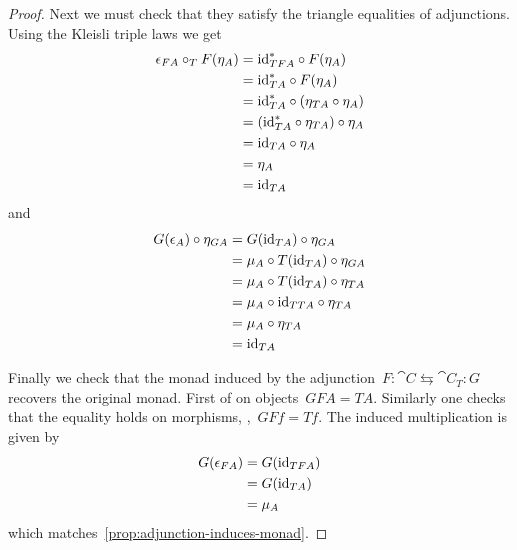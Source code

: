 \documentclass[../TFG.tex]{subfiles}
\begin{document}
\begin{proof}
    Next we must check that they satisfy the triangle equalities of adjunctions.
    Using the Kleisli triple laws we get
    \begin{align*}
        \epsilon_{FA} \circ_{T} F(\eta_{A}) 
            &= \mathrm{id}_{TFA}^{\ast} \circ F(\eta_{A}) \\
            &= \mathrm{id}_{TA}^{\ast} \circ F(\eta_{A}) \\
            &= \mathrm{id}_{TA}^{\ast} \circ (\eta_{TA} \circ \eta_{A}) \\
            &= (\mathrm{id}_{TA}^{\ast} \circ \eta_{TA}) \circ \eta_{A} \\
            &= \mathrm{id}_{TA} \circ \eta_{A} \\
            &= \eta_{A} \\
            &= \mathrm{id}_{TA}
    \end{align*}
    and
    \begin{align*}
        G(\epsilon_{A}) \circ \eta_{GA} 
            &= G(\mathrm{id}_{TA}) \circ \eta_{GA} \\
            &= \mu_{A} \circ T(\mathrm{id}_{TA}) \circ \eta_{GA} \\
            &= \mu_{A} \circ T(\mathrm{id}_{TA}) \circ \eta_{TA} \\
            &= \mu_{A} \circ \mathrm{id}_{TTA} \circ \eta_{TA} \\
            &= \mu_{A} \circ \eta_{TA} \\
            &= \mathrm{id}_{TA}
    \end{align*}

    Finally we check that the monad induced by the
    adjunction~\(F:\cat{C}\leftrightarrows\cat{C}_{T}:G\) recovers the original
    monad. First of on objects~\(GFA = TA\). Similarly one checks that the
    equality holds on morphisms, \ie,~\(GF f = T f\). The induced multiplication
    is given by
    \begin{align*}
        G(\epsilon_{FA}) 
            &= G(\mathrm{id}_{TFA}) \\
            &= G(\mathrm{id}_{TA}) \\
            &= \mu_{A}
    \end{align*}
    which matches~\ref{prop:adjunction-induces-monad}.
\end{proof}
\end{document}
